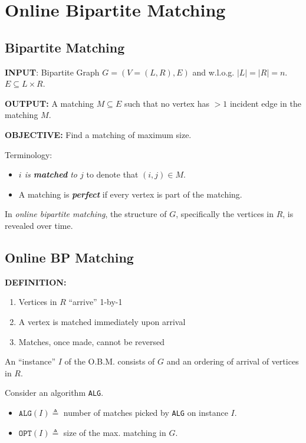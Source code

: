 
\section{Online Bipartite Matching}
\subsection{Bipartite Matching}

\textbf{INPUT}:  Bipartite Graph $G=(V=(L,R),E)$ and w.l.o.g. $|L| = |R| = n$. $E \subseteq L \times R$. 

\textbf{OUTPUT:} A matching $M \subseteq E$ such that no vertex has $> 1$ incident edge in the matching $M$. 

\textbf{OBJECTIVE:} Find a matching of maximum size.

Terminology:
\begin{itemize}
\item \textit{$i$ is \textbf{matched} to $j$ } to denote that $(i,j) \in M$.
\item A matching is \textbf{\textit{perfect}} if every vertex is part of the matching.
\end{itemize}


In \textit{online bipartite matching}, the structure of $G$, specifically the vertices in $R$, is revealed over time.

\subsection{Online BP Matching}
\label{sec:online-bipartite-matching}

\textbf{DEFINITION:}
\begin{enumerate}
\item Vertices in $R$ ``arrive'' 1-by-1
\item A vertex is matched immediately upon arrival
\item Matches, once made, cannot be reversed
\end{enumerate}

An ``instance'' $I$ of the O.B.M. consists of $G$ and an ordering  of arrival of vertices in $R$.

Consider an algorithm \texttt{ALG}.

\begin{itemize}
\item $\mathtt{ALG}(I) \triangleq $ number of matches picked by \texttt{ALG} on instance $I$.
\item $\mathtt{OPT}(I) \triangleq$ size of the max. matching in $G$.
\end{itemize}

